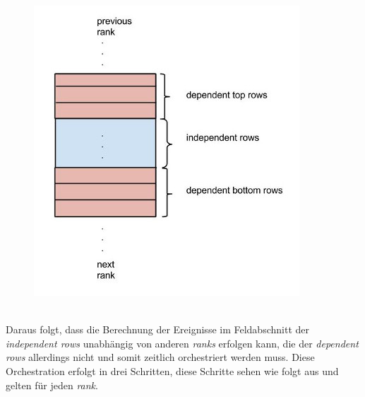 \begin{figure}[t]
\centering
\includegraphics[scale=0.6]{pics/dependent-rows.jpg}
\end{figure}
\quad \\
Daraus folgt, dass die Berechnung der Ereignisse im Feldabschnitt der \textit{independent rows} unabhängig von anderen \textit{ranks} erfolgen kann, die der \textit{dependent rows} allerdings nicht und somit zeitlich orchestriert werden muss.
Diese Orchestration erfolgt in drei Schritten, diese Schritte sehen wie folgt aus und gelten für jeden \textit{rank}.

